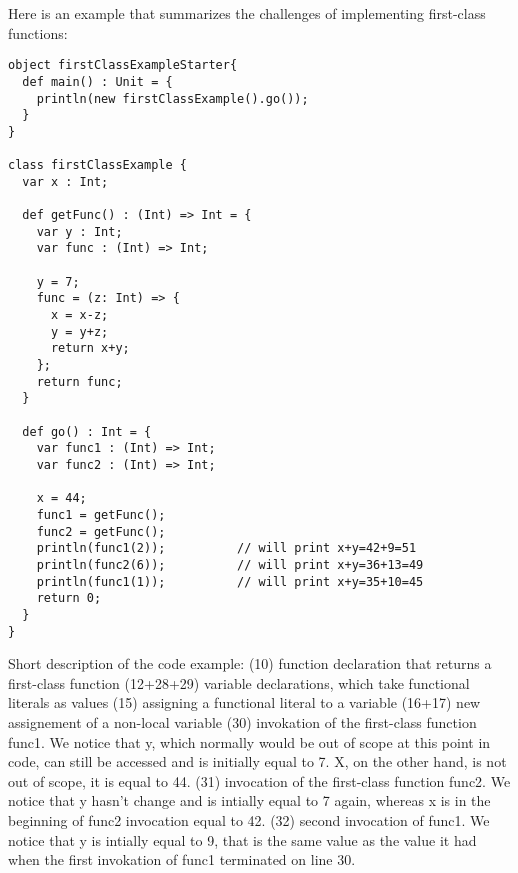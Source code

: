 Here is an example that summarizes the challenges of implementing first-class functions:

\lstset{
  numbers=left,
  numbersep=4pt
}
\begin{lstlisting}
object firstClassExampleStarter{
  def main() : Unit = {
    println(new firstClassExample().go());
  }
}

class firstClassExample {
  var x : Int;

  def getFunc() : (Int) => Int = {
    var y : Int;
    var func : (Int) => Int;

    y = 7;
    func = (z: Int) => {
      x = x-z;
      y = y+z;
      return x+y;
    };
    return func;
  }

  def go() : Int = {
    var func1 : (Int) => Int;
    var func2 : (Int) => Int;

    x = 44;
    func1 = getFunc();
    func2 = getFunc();
    println(func1(2));			// will print x+y=42+9=51
    println(func2(6));			// will print x+y=36+13=49
    println(func1(1));			// will print x+y=35+10=45
    return 0;
  }
}
\end{lstlisting}

Short description of the code example: \newline
(10) function declaration that returns a first-class function \newline
(12+28+29) variable declarations, which take functional literals as values \newline
(15) assigning a functional literal to a variable \newline
(16+17) new assignement of a non-local variable \newline
(30) invokation of the first-class function func1. We notice that y, which normally would be out of scope at this point in code, can still be accessed and is initially equal to 7. X, on the other hand, is not out of scope, it is equal to 44. \newline
(31) invocation of the first-class function func2. We notice that y hasn't change and is intially equal to 7 again, whereas x is in the beginning of func2 invocation equal to 42. \newline
(32) second invocation of func1. We notice that y is intially equal to 9, that is the same value as the value it had when the first invokation of func1 terminated on line 30. \newline
